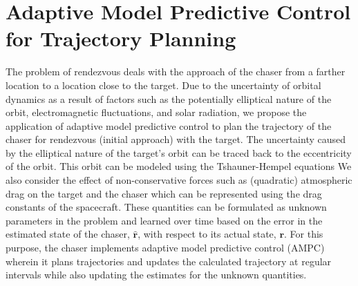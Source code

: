 \section{Adaptive Model Predictive Control for Trajectory Planning} \label{sec:chaser_ampc}
The problem of rendezvous deals with the approach of the chaser from a farther location to a location close to the target.
Due to the uncertainty of orbital dynamics as a result of factors such as the potentially elliptical nature of the orbit, electromagnetic fluctuations, and solar radiation, we propose the application of adaptive model predictive control to plan the trajectory of the chaser for rendezvous (initial approach) with the target.
The uncertainty caused by the elliptical nature of the target's orbit can be traced back to the eccentricity of the orbit.
This orbit can be modeled using the Tshauner-Hempel equations \cite{yamanaka2002new,sinclair2015geometric}
We also consider the effect of non-conservative forces such as (quadratic) atmospheric drag \cite{carter2002clohessy} on the target and the chaser which can be represented using the drag constants of the spacecraft.
These quantities can be formulated as unknown parameters in the problem and learned over time based on the error in the estimated state of the chaser, $\hat{\boldsymbol{r}}$, with respect to its actual state, $\boldsymbol{r}$.
For this purpose, the chaser implements adaptive model predictive control (AMPC) wherein it plans trajectories and updates the calculated trajectory at regular intervals while also updating the estimates for the unknown quantities.

